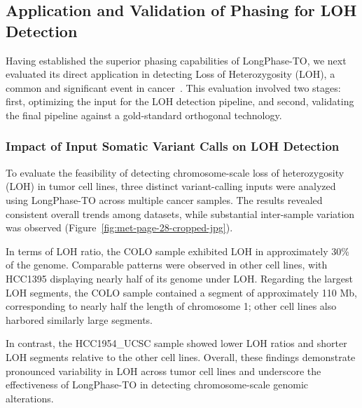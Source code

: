 \documentclass[pdflatex,sn-nature]{sn-jnl}
\begin{document}
\subsection{Application and Validation of Phasing for LOH Detection}\label{application-and-validation-of-phasing-for-loh-detection}

Having established the superior phasing capabilities of LongPhase-TO, we next evaluated its direct application in detecting Loss of Heterozygosity (LOH), a common and significant event in cancer~\cite{ryland2015, nichols2020}. This evaluation involved two stages: first, optimizing the input for the LOH detection pipeline, and second, validating the final pipeline against a gold-standard orthogonal technology.

\subsubsection{Impact of Input Somatic Variant Calls on LOH Detection}\label{impact-of-input-somatic-variant-calls-on-loh-detection}

To evaluate the feasibility of detecting chromosome-scale loss of heterozygosity (LOH) in tumor cell lines, three distinct variant-calling inputs were analyzed using LongPhase-TO across multiple cancer samples. The results revealed consistent overall trends among datasets, while substantial inter-sample variation was observed (Figure~\ref{fig:met-page-28-cropped-jpg}).

In terms of LOH ratio, the COLO sample exhibited LOH in approximately 30\% of the genome. Comparable patterns were observed in other cell lines, with HCC1395 displaying nearly half of its genome under LOH. Regarding the largest LOH segments, the COLO sample contained a segment of approximately 110 Mb, corresponding to nearly half the length of chromosome 1; other cell lines also harbored similarly large segments.

In contrast, the HCC1954\_UCSC sample showed lower LOH ratios and shorter LOH segments relative to the other cell lines. Overall, these findings demonstrate pronounced variability in LOH across tumor cell lines and underscore the effectiveness of LongPhase-TO in detecting chromosome-scale genomic alterations.
\end{document}
